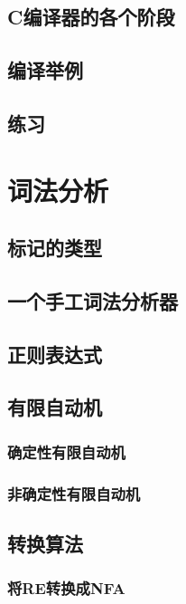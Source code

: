 \documentclass[cn,11pt,chinese]{elegantbook}
\begin{document}
\section{C编译器的各个阶段}

\section{编译举例}

\section{练习}

\chapter{词法分析}

\section{标记的类型}

\section{一个手工词法分析器}

\section{正则表达式}

\section{有限自动机}

\subsection{确定性有限自动机}

\subsection{非确定性有限自动机}

\section{转换算法}

\subsection{将RE转换成NFA}
\end{document}
